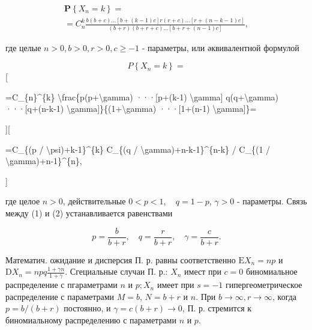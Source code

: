\documentclass[10pt]{article}
\begin{document}
\[

\begin{gathered}

\boldsymbol{P}\left\{X_{n}=k\right\}= \\

=C_{n}^{k} \frac{b(b+c) \ldots[b+(k-1) c] r(r+c) \ldots[r+(n-k-1) c]}{(b+r)(b+r+c) \ldots[b+r+(n-1) c]},

\end{gathered}

\]



где целые $n>0, b>0, r>0, c \geqslant-1$ - параметры, или әквивалентной формулой



\[

P\left\{X_{n}=k\right\}=

\][



=C\_\{n\}\^{}\{k\} \textbackslash frac\{p(p+\textbackslash gamma) ···[p+(k-1) \textbackslash gamma] q(q+\textbackslash gamma) ···[q+(n-k-1) \textbackslash gamma]\}\{(1+\textbackslash gamma) ···[1+(n-1) \textbackslash gamma]\}=



][



=C\_\{(p / \textbackslash psi)+k-1\}\^{}\{k\} C\_\{(q / \textbackslash gamma)+n-k-1\}\^{}\{n-k\} / C\_\{(1 / \textbackslash gamma)+n-1\}\^{}\{n\},

]



где целое $n>0$, действительные $0<p<1, \quad q=1-p$, $\gamma>0$ - параметры. Связь между (1) и (2) устанавливается равенствами



\[

p=\frac{b}{b+r}, \quad q=\frac{r}{b+r}, \quad \gamma=\frac{c}{b+r} .

\]



Математич. ожидание и дисперсия П. р. равны соответственно $\mathrm{E} X_{n}=n p$ и $\mathrm{D} X_{n}=n p q \frac{1+\gamma n}{1+\gamma}$. Сгециальные случаи П. р.: $X_{n}$ имест при $c=0$ биномиальное распределение с пгараметрами $n$ и $p ; X_{n}$ имеет при $s=-1$ гипергеометрическое распределение с параметрами $M=b$, $N=b+r$ и $n$. При $b \rightarrow \infty, r \rightarrow \infty$, когда $p=b /(b+r)$ постоянно, и $\gamma=c(b+r) \rightarrow 0$, П. р. стремится к биномиальному распределению с параметрами $n$ и $p$.
\end{document}
